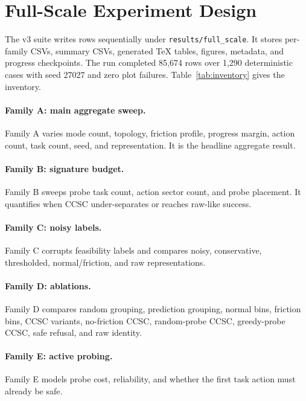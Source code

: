 \documentclass{article}
\begin{document}
\section{Full-Scale Experiment Design}
The v3 suite writes rows sequentially under \texttt{results/full\_scale}. It stores per-family CSVs, summary CSVs, generated TeX tables, figures, metadata, and progress checkpoints. The run completed 85,674 rows over 1,290 deterministic cases with seed 27027 and zero plot failures. Table~\ref{tab:inventory} gives the inventory.

\begin{table}[t]
\centering
\caption{V3 full-scale experiment inventory. Rows are method-condition or method-condition-task measurements. Family H is task-conditioned because the theorem is task-specific.}
\label{tab:inventory}
\small

\end{table}

\paragraph{Family A: main aggregate sweep.}
Family A varies mode count, topology, friction profile, progress margin, action count, task count, seed, and representation. It is the headline aggregate result.

\paragraph{Family B: signature budget.}
Family B sweeps probe task count, action sector count, and probe placement. It quantifies when CCSC under-separates or reaches raw-like success.

\paragraph{Family C: noisy labels.}
Family C corrupts feasibility labels and compares noisy, conservative, thresholded, normal/friction, and raw representations.

\paragraph{Family D: ablations.}
Family D compares random grouping, prediction grouping, normal bins, friction bins, CCSC variants, no-friction CCSC, random-probe CCSC, greedy-probe CCSC, safe refusal, and raw identity.

\paragraph{Family E: active probing.}
Family E models probe cost, reliability, and whether the first task action must already be safe.
\end{document}
